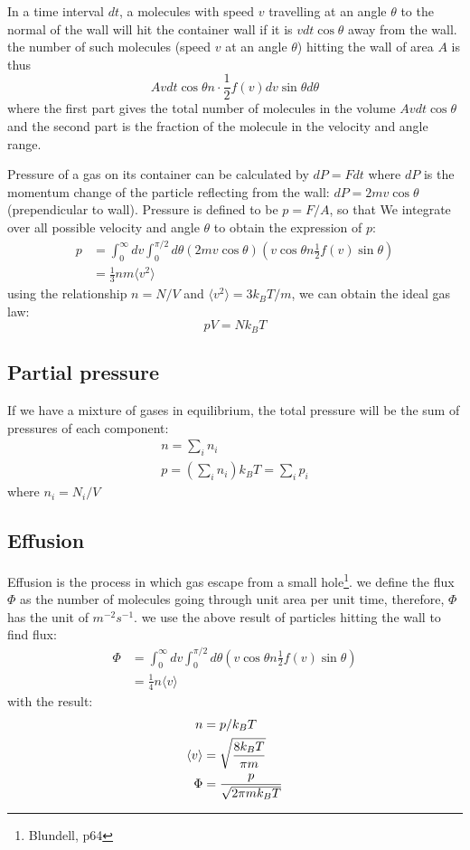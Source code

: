 \documentclass{article}
\begin{document}
In a time interval $dt$, 
a molecules with speed $v$ travelling at an angle $\theta$ to the normal of the wall
will hit the container wall if it is $vdt\cos \theta$ away from the wall. 
the number of such molecules (speed $v$ at an angle $\theta$) 
hitting the wall of area $A$ is thus 
\begin{equation}
    A vdt\cos \theta n \cdot \frac{1}{2} f(v) dv \sin\theta d\theta 
\end{equation}
where the first part gives the total number of molecules in the volume $A vdt\cos \theta$ and 
the second part is the fraction of the molecule in the velocity and angle range.

Pressure of a gas on its container can be calculated by $dP = F dt$ where $dP$ is the momentum 
change of the particle reflecting from the wall: $dP = 2 mv \cos\theta$ (prependicular to wall). 
Pressure is defined to be $p = F/A$, so that 
We integrate over all possible velocity and angle $\theta$ to obtain the expression of $p$:
\begin{align}
    p &= \int_0^{\infty} dv \int_0^{\pi/2} d\theta  ( 2 mv \cos\theta ) 
    \left( v \cos \theta n \frac{1}{2} f(v) \sin\theta \right) \\
    &= \frac{1}{3} n m \langle v^2 \rangle
\end{align}
using the relationship $n = N/V$ and $\langle v^2 \rangle = 3k_BT / m$, we 
can obtain the ideal gas law:
\begin{equation}
    pV = N k_B T
\end{equation}

\subsection*{Partial pressure}
If we have a mixture of gases in equilibrium, the total pressure will be the 
sum of pressures of each component:
\begin{gather}
    n = \sum_i n_i \\
    p = \left( \sum_i n_i \right) k_B T = \sum_i p_i
\end{gather}
where $n_i = N_i / V$

\subsection{Effusion}
Effusion is the process in which gas escape from a small hole\footnote{Blundell, p64}. we define 
the flux $\Phi$ as the number of molecules going through unit area per unit time,
therefore, $\Phi$ has the unit of $m^{-2}s^{-1}$. we use the above result of particles 
hitting the wall to find flux:
\begin{align}
    \Phi &= \int_0^{\infty} dv \int_0^{\pi/2} d\theta 
            \left( v \cos \theta n \frac{1}{2} f(v) \sin\theta \right) \label{flux} \\
        &= \frac{1}{4} n \langle v \rangle
\end{align}
with the result:
\begin{align}
    n &= p / k_B T \notag \\
    \langle v \rangle &= \sqrt{\frac{8k_BT}{\pi m}} \notag \\
    \Phi &= \frac{p}{\sqrt{2\pi m k_BT}}
\end{align}
\end{document}
